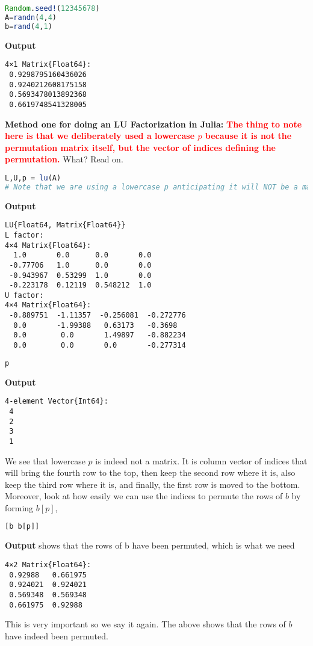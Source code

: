 \begin{itemize}
\begin{lstlisting}[language=Julia,style=mystyle]
Random.seed!(12345678)
A=randn(4,4)
b=rand(4,1)
\end{lstlisting}
\textbf{Output}
\begin{verbatim}
4×1 Matrix{Float64}:
 0.9298795160436026
 0.9240212608175158
 0.5693478013892368
 0.6619748541328005
\end{verbatim}
\textbf{Method one for doing an LU Factorization in Julia:} \textcolor{red}{\bf The thing to note here is that we deliberately used a lowercase $p$ because it is not the permutation matrix itself, but the vector of indices defining the permutation.} What? Read on. 
\begin{lstlisting}[language=Julia,style=mystyle]
L,U,p = lu(A)
# Note that we are using a lowercase p anticipating it will NOT be a matrix
\end{lstlisting}
\textbf{Output}
\begin{verbatim}
LU{Float64, Matrix{Float64}}
L factor:
4×4 Matrix{Float64}:
  1.0       0.0      0.0       0.0
 -0.77706   1.0      0.0       0.0
 -0.943967  0.53299  1.0       0.0
 -0.223178  0.12119  0.548212  1.0
U factor:
4×4 Matrix{Float64}:
 -0.889751  -1.11357  -0.256081  -0.272776
  0.0       -1.99388   0.63173   -0.3698
  0.0        0.0       1.49897   -0.882234
  0.0        0.0       0.0       -0.277314
\end{verbatim}
\begin{lstlisting}[language=Julia,style=mystyle]
p
\end{lstlisting}
\textbf{Output}
\begin{verbatim}
4-element Vector{Int64}:
 4
 2
 3
 1
\end{verbatim}
We see that lowercase $p$ is indeed not a matrix. It is column vector of indices that will bring the fourth row to the top, then keep the second row where it is, also keep the third row where it is, and finally, the first row is moved to the bottom. Moreover, look at how easily we can use the indices to permute the rows of $b$ by forming $b[p]$,
\begin{lstlisting}[language=Julia,style=mystyle]
[b b[p]]
\end{lstlisting}
\textbf{Output} shows that the rows of b have been permuted, which is what we need
\begin{verbatim}
4×2 Matrix{Float64}:
 0.92988   0.661975
 0.924021  0.924021
 0.569348  0.569348
 0.661975  0.92988
 \end{verbatim}
This is very important so we say it again. The above shows that the rows of $b$ have indeed been permuted.
\begin{lstlisting}[language=Julia,style=mystyle]

\end{lstlisting}
\end{itemize}
